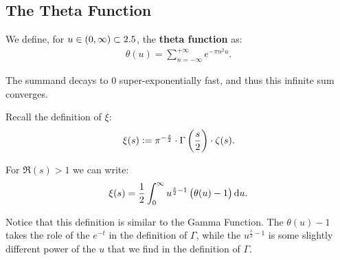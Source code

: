 \subsection{The Theta Function}

\begin{definition}
We define, for $u \in (0,\infty) \subset 2.5$, the \textbf{theta function} as:
\begin{align*}
    \theta(u) = \sum_{n=-\infty}^{+\infty} e^{- \pi n^2 u}.
\end{align*}
\end{definition}
The summand decays to $0$ super-exponentially fast, and thus this infinite sum converges.

Recall the definition of $\xi$:
\begin{align*}
    \xi(s) \vcentcolon = \pi^{-\frac{s}{2}} \cdot \Gamma\left( \frac{s}{2} \right) \cdot \zeta(s).
\end{align*}

\begin{lemma}\label{lem:zeta-theta-integral}
For $\Re(s) > 1$ we can write:
\begin{align*}
    \xi(s) = \frac{1}{2} \int_0^\infty u^{\frac{s}{2} - 1} \br{\theta(u) - 1} \dif u.
\end{align*}
\end{lemma}

\begin{note}
Notice that this definition is similar to the Gamma Function. The $\theta(u) - 1$ takes the role of the $e^{-t}$ in the definition of $\Gamma$, while the $u^{\frac{s}{2} - 1} $ is some slightly different power of the $u$ that we find in the definition of $\Gamma$.
\end{note}

